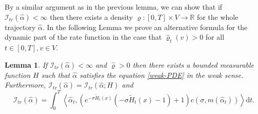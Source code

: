 \documentclass[11pt]{article}
\numberwithin{equation}{section}
\theoremstyle{definition}
\theoremstyle{plain}
\newtheorem{Lemma}[Theorem]{Lemma}
\newcommand{\dd}{\mathrm{d}}
\begin{document}
By a similar argument as in the previous lemma, we can show that if $\mathcal{I}_{tr}(\widehat{\alpha})<\infty$ then there exists a density $\widehat{\varrho}: [0,T]\times V\to\mathbb{R}$ for the whole trajectory $\widehat{\alpha}$. In the following Lemma we prove an alternative formula for the dynamic part of the rate function in the case that $\widehat{\varrho}_t(v)>0$ for all $t\in[0,T], v\in V$.
\begin{Lemma}\label{corollary ldp}
     If $\mathcal{I}_{tr}(\widehat{\alpha})<\infty$ and $\widehat{\varrho}>0$ then there exists a bounded measurable function $H$ such that $\widehat{\alpha}$ satisfies the equation \eqref{weak-PDE} in the weak sense. Furthermore, $\mathcal{I}_{tr}(\widehat{\alpha}) = \mathcal{I}_{tr}(\widehat{\alpha};H)$ and
        \begin{equation}\label{exact formula rate}
            \mathcal{I}_{tr}(\widehat{\alpha}) = \int_0^T  \left\langle \widehat{\alpha}_t, \left( e^{-\sigma  \widetilde{H}_t(x)}(-\sigma  \widetilde{H}_t(x) -1) +1\right) c(\sigma, m(\widehat{\alpha}_t))\right\rangle \dd t.
        \end{equation}
\end{Lemma}
\end{document}
